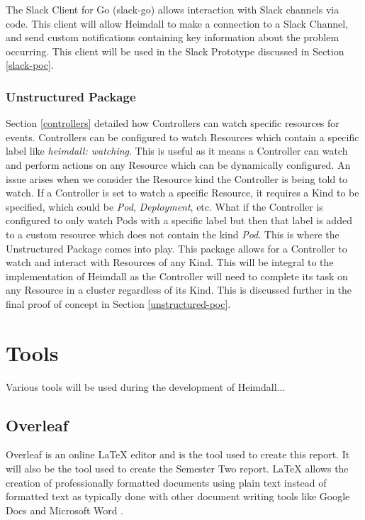 \documentclass{article}
\begin{document}
The Slack Client for Go (slack-go) allows interaction with Slack channels via code. This client will allow Heimdall to make a connection to a Slack Channel, and send custom notifications containing key information about the problem occurring. This client will be used in the Slack Prototype discussed in Section \ref{slack-poc}.

\subsubsection{Unstructured Package}

Section \ref{controllers} detailed how Controllers can watch specific resources for events. Controllers can be configured to watch Resources which contain a specific label like \emph{heimdall: watching}. This is useful as it means a Controller can watch and perform actions on any Resource which can be dynamically configured. An issue arises when we consider the Resource kind the Controller is being told to watch. If a Controller is set to watch a specific Resource, it requires a Kind to be specified, which could be \emph{Pod}, \emph{Deployment}, etc. What if the Controller is configured to only watch Pods with a specific label but then that label is added to a custom resource which does not contain the kind \emph{Pod}. This is where the Unstructured Package comes into play. This package allows for a Controller to watch and interact with Resources of any Kind. This will be integral to the implementation of Heimdall as the Controller will need to complete its task on any Resource in a cluster regardless of its Kind. This is discussed further in the final proof of concept in Section \ref{unstructured-poc}.



\section{Tools}

Various tools will be used during the development of Heimdall...

\subsection{Overleaf}

Overleaf is an online LaTeX editor and is the tool used to create this report. It will also be the tool used to create the Semester Two report. LaTeX allows the creation of professionally formatted documents using plain text instead of formatted text as typically done with other document writing tools like Google Docs and Microsoft Word \cite{overleaf}.
\end{document}
